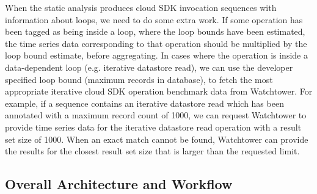 When the static analysis produces cloud SDK invocation sequences with information about loops, we 
need to do some extra work. If some operation has been tagged as being inside a loop, where the loop
bounds have been estimated, the time series data corresponding to that operation should be multiplied 
by the loop bound estimate, before aggregating. In cases where the operation is inside a data-dependent
loop (e.g. iterative datastore read), we can use the developer specified loop bound (maximum records
in database), to fetch the most appropriate iterative cloud SDK operation benchmark data from Watchtower.
For example, if a sequence contains an iterative datastore read which has been annotated with a maximum
record count of 1000, we can request Watchtower to provide time series data for the iterative datastore
read operation with a result set size of 1000. When an exact match cannot be found, Watchtower can
provide the results for the closest result set size that is larger than the requested limit.

\subsection{Overall Architecture and Workflow}